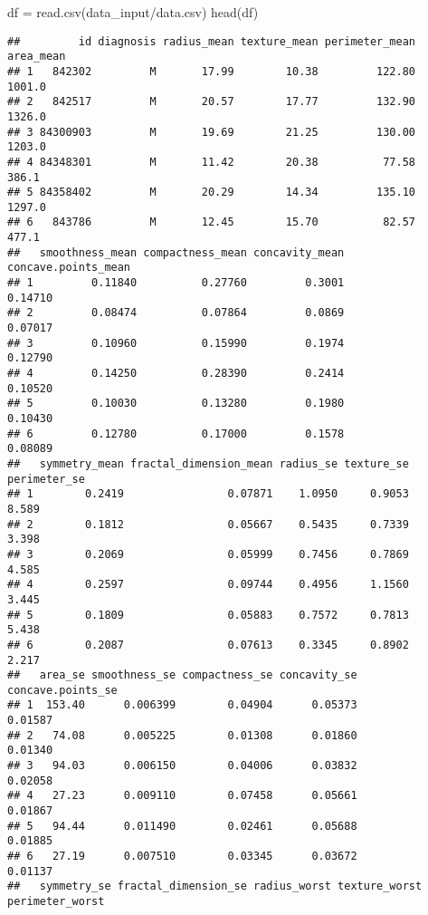 \documentclass[
]{article}
\newenvironment{Shaded}{\begin{snugshade}}{\end{snugshade}}
\newcommand{\FunctionTok}[1]{\textcolor[rgb]{0.00,0.00,0.00}{#1}}
\newcommand{\NormalTok}[1]{#1}
\newcommand{\OtherTok}[1]{\textcolor[rgb]{0.56,0.35,0.01}{#1}}
\newcommand{\StringTok}[1]{\textcolor[rgb]{0.31,0.60,0.02}{#1}}
\begin{document}
\begin{Shaded}
\begin{Highlighting}[]
\NormalTok{df }\OtherTok{=} \FunctionTok{read.csv}\NormalTok{(}\StringTok{\textquotesingle{}data\_input/data.csv\textquotesingle{}}\NormalTok{)}
\FunctionTok{head}\NormalTok{(df)}
\end{Highlighting}
\end{Shaded}

\begin{verbatim}
##         id diagnosis radius_mean texture_mean perimeter_mean area_mean
## 1   842302         M       17.99        10.38         122.80    1001.0
## 2   842517         M       20.57        17.77         132.90    1326.0
## 3 84300903         M       19.69        21.25         130.00    1203.0
## 4 84348301         M       11.42        20.38          77.58     386.1
## 5 84358402         M       20.29        14.34         135.10    1297.0
## 6   843786         M       12.45        15.70          82.57     477.1
##   smoothness_mean compactness_mean concavity_mean concave.points_mean
## 1         0.11840          0.27760         0.3001             0.14710
## 2         0.08474          0.07864         0.0869             0.07017
## 3         0.10960          0.15990         0.1974             0.12790
## 4         0.14250          0.28390         0.2414             0.10520
## 5         0.10030          0.13280         0.1980             0.10430
## 6         0.12780          0.17000         0.1578             0.08089
##   symmetry_mean fractal_dimension_mean radius_se texture_se perimeter_se
## 1        0.2419                0.07871    1.0950     0.9053        8.589
## 2        0.1812                0.05667    0.5435     0.7339        3.398
## 3        0.2069                0.05999    0.7456     0.7869        4.585
## 4        0.2597                0.09744    0.4956     1.1560        3.445
## 5        0.1809                0.05883    0.7572     0.7813        5.438
## 6        0.2087                0.07613    0.3345     0.8902        2.217
##   area_se smoothness_se compactness_se concavity_se concave.points_se
## 1  153.40      0.006399        0.04904      0.05373           0.01587
## 2   74.08      0.005225        0.01308      0.01860           0.01340
## 3   94.03      0.006150        0.04006      0.03832           0.02058
## 4   27.23      0.009110        0.07458      0.05661           0.01867
## 5   94.44      0.011490        0.02461      0.05688           0.01885
## 6   27.19      0.007510        0.03345      0.03672           0.01137
##   symmetry_se fractal_dimension_se radius_worst texture_worst perimeter_worst

\end{verbatim}
\end{document}
